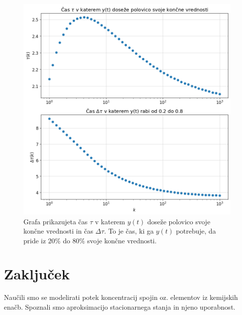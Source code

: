 \documentclass[slovene,11pt,a4paper]{article}
\begin{document}
\begin{figure}[h!]
\centering
\includegraphics[width=14cm]{ura2.png}
\caption{Grafa prikazujeta čas $\tau$ v katerem $y(t)$ doseže polovico svoje končne vrednosti in čas $\Delta\tau$. To je čas, ki ga $y(t)$ potrebuje, da pride iz $20\%$ do $80\%$ svoje končne vrednosti.}
\end{figure}

\section{Zaključek}

Naučili smo se modelirati potek koncentracij spojin oz. elementov iz kemijskih enačb. Spoznali smo aproksimacijo stacionarnega stanja in njeno uporabnost.
\end{document}
